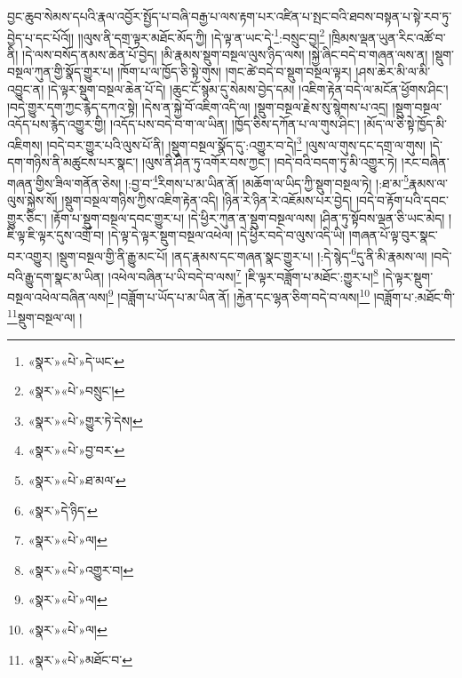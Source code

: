 བྱང་ཆུབ་སེམས་དཔའི་རྣལ་འབྱོར་སྤྱོད་པ་བཞི་བརྒྱ་པ་ལས་རྟག་པར་འཛིན་པ་སྤང་བའི་ཐབས་བསྟན་པ་སྟེ་རབ་ཏུ་བྱེད་པ་དང་པོའོ།། །།ལུས་ནི་དགྲ་ལྟར་མཐོང་མོད་ཀྱི། །དེ་ལྟ་ན་ཡང་དེ་\footnote{«སྣར་»«པེ་»དེ་ཡང་}:བསྲུང་བྱ།\footnote{«སྣར་»«པེ་»བསྲུང་།} །ཁྲིམས་ལྡན་ཡུན་རིང་འཚོ་བ་ནི། །དེ་ལས་བསོད་ནམས་ཆེན་པོ་བྱེད། །མི་རྣམས་སྡུག་བསྔལ་ལུས་ཉིད་ལས། །སྐྱེ་ཞིང་བདེ་བ་གཞན་ལས་ན། །སྡུག་བསྔལ་ཀུན་གྱི་སྣོད་གྱུར་པ། །ཁོག་པ་ལ་ཁྱོད་ཅི་སྟེ་གུས། །གང་ཚེ་བདེ་བ་སྡུག་བསྔལ་ལྟར། །ཤས་ཆེར་མི་ལ་མི་འབྱུང་ན། །དེ་ལྟར་སྡུག་བསྔལ་ཆེན་པོ་དེ། །ཆུང་ངོ་སྙམ་དུ་སེམས་བྱེད་དམ། །འཇིག་རྟེན་བདེ་ལ་མངོན་ཕྱོགས་ཤིང་། །བདེ་གྱུར་དག་ཀྱང་རྙེད་དཀའ་སྟེ། །དེས་ན་སྐྱེ་བོ་འཇིག་འདི་ལ། །སྡུག་བསྔལ་རྗེས་སུ་སྙེགས་པ་འདྲ། །སྡུག་བསྔལ་འདོད་པས་རྙེད་འགྱུར་གྱི། །འདོད་པས་བདེ་བ་ག་ལ་ཡིན། །ཁྱོད་ཅིས་དཀོན་པ་ལ་གུས་ཤིང་། །མོད་ལ་ཅི་སྟེ་ཁྱོད་མི་འཇིགས། །བདེ་བར་གྱུར་པའི་ལུས་པོ་ནི། །སྡུག་བསྔལ་སྣོད་དུ་:འགྱུར་བ་དེ།\footnote{«སྣར་»«པེ་»གྱུར་ཏེ་དེས།} །ལུས་ལ་གུས་དང་དགྲ་ལ་གུས། །དེ་དག་གཉིས་ནི་མཚུངས་པར་སྣང་། །ལུས་ནི་ཤིན་ཏུ་འགོར་བས་ཀྱང་། །བདེ་བའི་བདག་ཏུ་མི་འགྱུར་ཏེ། །རང་བཞིན་གཞན་གྱིས་ཟིལ་གནོན་ཅེས། །:བྱ་བ་\footnote{«སྣར་»«པེ་»བྱ་བར་}རིགས་པ་མ་ཡིན་ནོ། །མཆོག་ལ་ཡིད་ཀྱི་སྡུག་བསྔལ་ཏེ། །:ཐ་མ་\footnote{«སྣར་»«པེ་»ཐ་མལ་}རྣམས་ལ་ལུས་སྐྱེས་སོ། །སྡུག་བསྔལ་གཉིས་ཀྱིས་འཇིག་རྟེན་འདི། །ཉིན་རེ་ཉིན་རེ་འཇོམས་པར་བྱེད། །བདེ་བ་རྟོག་པའི་དབང་གྱུར་ཅིང་། །རྟོག་པ་སྡུག་བསྔལ་དབང་གྱུར་པ། །དེ་ཕྱིར་ཀུན་ན་སྡུག་བསྔལ་ལས། །ཤིན་ཏུ་སྟོབས་ལྡན་ཅི་ཡང་མེད། །ཇི་ལྟ་ཇི་ལྟར་དུས་འགྲོ་བ། །དེ་ལྟ་དེ་ལྟར་སྡུག་བསྔལ་འཕེལ། །དེ་ཕྱིར་བདེ་བ་ལུས་འདི་ཡི། །གཞན་པོ་ལྟ་བུར་སྣང་བར་འགྱུར། །སྡུག་བསྔལ་གྱི་ནི་རྒྱུ་མང་པོ། །ནད་རྣམས་དང་གཞན་སྣང་གྱུར་པ། །:དེ་སྙེད་\footnote{«སྣར་»དེ་ཉིད་}དུ་ནི་མི་རྣམས་ལ། །བདེ་བའི་རྒྱུ་དག་སྣང་མ་ཡིན། །འཕེལ་བཞིན་པ་ཡི་བདེ་བ་ལས།\footnote{«སྣར་»«པེ་»ལ།} །ཇི་ལྟར་བཟློག་པ་མཐོང་:གྱུར་པ།\footnote{«སྣར་»«པེ་»འགྱུར་བ།} །དེ་ལྟར་སྡུག་བསྔལ་འཕེལ་བཞིན་ལས།\footnote{«སྣར་»«པེ་»ལ།} །བཟློག་པ་ཡོད་པ་མ་ཡིན་ནོ། །རྐྱེན་དང་ལྷན་ཅིག་བདེ་བ་ལས།\footnote{«སྣར་»«པེ་»ལ།} །བཟློག་པ་:མཐོང་གི་\footnote{«སྣར་»«པེ་»མཐོང་བ་}སྡུག་བསྔལ་ལ། །
